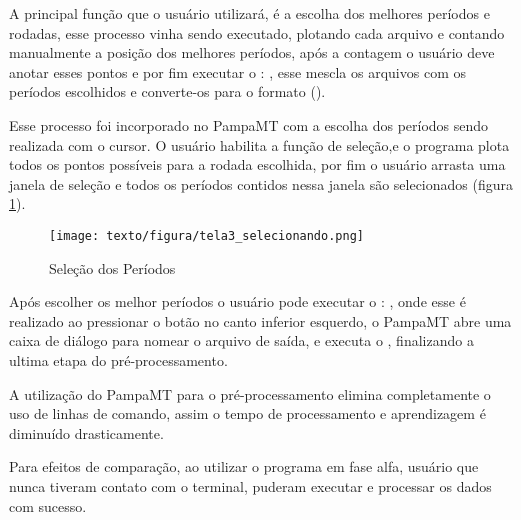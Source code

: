    A principal função que o usuário utilizará, é a escolha dos melhores períodos e rodadas, esse processo vinha sendo executado, plotando cada arquivo  e contando manualmente a posição dos melhores períodos, após a contagem o usuário deve anotar esses pontos e por fim executar o : , esse  mescla os arquivos  com os períodos escolhidos e converte-os para o formato  ().
    
    Esse processo foi incorporado no PampaMT com a escolha dos períodos sendo realizada com o cursor. O usuário habilita a função de seleção,e o programa plota todos os pontos possíveis para a rodada escolhida, por fim o usuário arrasta uma janela de seleção e todos os períodos contidos nessa janela são selecionados (figura \ref{selc-perio}).
    
    \begin{figure}[H]
        \caption{Seleção dos Períodos}
            \begin{center}
                \texttt{[image: texto/figura/tela3\_selecionando.png]}
            \end{center}
        \label{selc-perio}
    \end{figure}
    
    Após escolher os melhor períodos o usuário pode executar o : , onde esse é realizado ao pressionar o botão no canto inferior esquerdo, o PampaMT abre uma caixa de diálogo para nomear o arquivo de saída, e executa o , finalizando a ultima etapa do pré-processamento.
    
    A utilização do PampaMT para o pré-processamento elimina completamente o uso de linhas de comando, assim o tempo de processamento e aprendizagem é diminuído drasticamente.
    
    Para efeitos de comparação, ao utilizar o programa em fase alfa, usuário que nunca tiveram contato com o terminal, puderam executar e processar os dados com sucesso.
    
    
    
    
    
